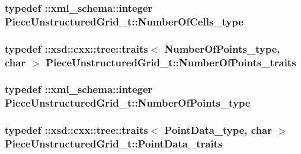 \subsubsection[{\texorpdfstring{Number\+Of\+Cells\+\_\+type}{NumberOfCells_type}}]{\setlength{\rightskip}{0pt plus 5cm}typedef \+::{\bf xml\+\_\+schema\+::integer} {\bf Piece\+Unstructured\+Grid\+\_\+t\+::\+Number\+Of\+Cells\+\_\+type}}\hypertarget{classPieceUnstructuredGrid__t_aeae5546900c50a4abe9b3aea485e97d0}{}\label{classPieceUnstructuredGrid__t_aeae5546900c50a4abe9b3aea485e97d0}
\subsubsection[{\texorpdfstring{Number\+Of\+Points\+\_\+traits}{NumberOfPoints_traits}}]{\setlength{\rightskip}{0pt plus 5cm}typedef \+::xsd\+::cxx\+::tree\+::traits$<$ {\bf Number\+Of\+Points\+\_\+type}, char $>$ {\bf Piece\+Unstructured\+Grid\+\_\+t\+::\+Number\+Of\+Points\+\_\+traits}}\hypertarget{classPieceUnstructuredGrid__t_acdfbb1dc264a5a48bcc6d4aa815db003}{}\label{classPieceUnstructuredGrid__t_acdfbb1dc264a5a48bcc6d4aa815db003}
\subsubsection[{\texorpdfstring{Number\+Of\+Points\+\_\+type}{NumberOfPoints_type}}]{\setlength{\rightskip}{0pt plus 5cm}typedef \+::{\bf xml\+\_\+schema\+::integer} {\bf Piece\+Unstructured\+Grid\+\_\+t\+::\+Number\+Of\+Points\+\_\+type}}\hypertarget{classPieceUnstructuredGrid__t_a8df1cd0d138d990e166d325ceed9a660}{}\label{classPieceUnstructuredGrid__t_a8df1cd0d138d990e166d325ceed9a660}
\subsubsection[{\texorpdfstring{Point\+Data\+\_\+traits}{PointData_traits}}]{\setlength{\rightskip}{0pt plus 5cm}typedef \+::xsd\+::cxx\+::tree\+::traits$<$ {\bf Point\+Data\+\_\+type}, char $>$ {\bf Piece\+Unstructured\+Grid\+\_\+t\+::\+Point\+Data\+\_\+traits}}\hypertarget{classPieceUnstructuredGrid__t_aee3c7ac7c46c4ebc9f248d31c458d300}{}\label{classPieceUnstructuredGrid__t_aee3c7ac7c46c4ebc9f248d31c458d300}
